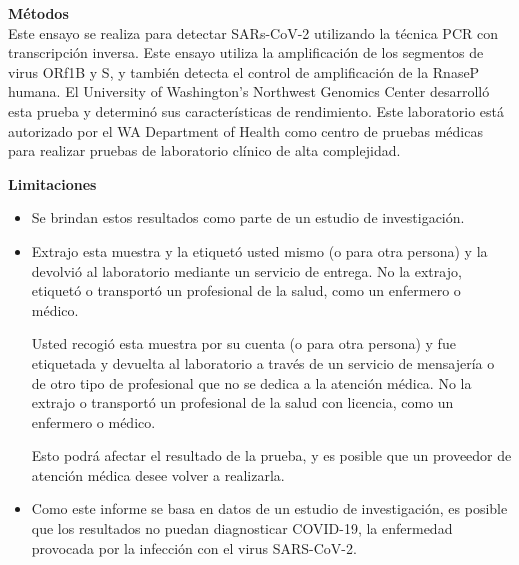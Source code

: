 \documentclass[10pt]{article}
\begin{document}
\textbf{Métodos}\\
Este ensayo se realiza para detectar SARs-CoV-2 utilizando la técnica PCR con
transcripción inversa. Este ensayo utiliza la amplificación de los segmentos de
virus ORf1B y S, y también detecta el control de amplificación de la RnaseP
humana. El University of Washington’s Northwest Genomics Center desarrolló esta
prueba y determinó sus características de rendimiento. Este laboratorio está
autorizado por el WA Department of Health como centro de pruebas médicas para
realizar pruebas de laboratorio clínico de alta complejidad.

\textbf{Limitaciones}

\begin{itemize}

\item

  Se brindan estos resultados como parte de un estudio de investigación.

\item

  Extrajo esta muestra y la etiquetó usted mismo (o para otra persona) y la
  devolvió al laboratorio mediante un servicio de entrega. No la extrajo,
  etiquetó o transportó un profesional de la salud, como un enfermero o médico.

  Usted recogió esta muestra por su cuenta (o para otra persona) y fue etiquetada
  y devuelta al laboratorio a través de un servicio de mensajería o de otro
  tipo de profesional que no se dedica a la atención médica.  No la extrajo o
  transportó un profesional de la salud con licencia, como un enfermero o
  médico.



  Esto podrá afectar el resultado de la prueba, y es posible que un proveedor de
  atención médica desee volver a realizarla.

\item

  Como este informe se basa en datos de un estudio de investigación, es posible
  que los resultados no puedan diagnosticar COVID-19, la enfermedad provocada
  por la infección con el virus SARS-CoV-2.

\end{itemize}
\end{document}
